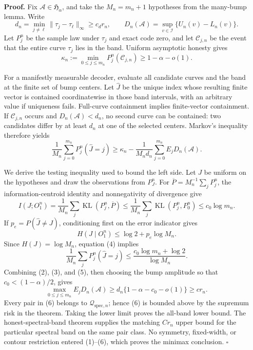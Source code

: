 \textbf{Proof.}
Fix \(\mathcal A\in\mathfrak H_\alpha\), and take the \(M_n=m_n+1\) hypotheses from the many-bump lemma.  Write
\[
 d_n=\min_{j\ne\ell}\|\tau_j-\tau_\ell\|_\infty\ge c_dr_n,
 \qquad
 D_n(\mathcal A)=\sup_{v\in\mathcal I}\{U_n(v)-L_n(v)\}. \tag{1}
\]
Let \(P_j^n\) be the sample law under \(\tau_j\) and exact code zero, and let \(\mathcal C_{j,n}\) be the event that the entire curve \(\tau_j\) lies in the band.  Uniform asymptotic honesty gives
\[
 \kappa_n:=\min_{0\le j\le m_n}P_j^n(\mathcal C_{j,n})
 \ge1-\alpha-o(1). \tag{2}
\]

For a manifestly measurable decoder, evaluate all candidate curves and the band at the finite set of bump centers.  Let \(\widehat J\) be the unique index whose resulting finite vector is contained coordinatewise in those band intervals, with an arbitrary value if uniqueness fails.  Full-curve containment implies finite-vector containment.  If \(\mathcal C_{j,n}\) occurs and \(D_n(\mathcal A)<d_n\), no second curve can be contained: two candidates differ by at least \(d_n\) at one of the selected centers.  Markov's inequality therefore yields
\[
 \frac1{M_n}\sum_{j=0}^{m_n}P_j^n(\widehat J=j)
 \ge \kappa_n-
 \frac1{M_nd_n}\sum_{j=0}^{m_n}E_jD_n(\mathcal A). \tag{3}
\]

We derive the testing inequality used to bound the left side.  Let \(J\) be uniform on the hypotheses and draw the observations from \(P_J^n\).  For \(\overline P=M_n^{-1}\sum_jP_j^n\), the information-centroid identity and nonnegativity of divergence give
\[
 I(J;O_1^n)=\frac1{M_n}\sum_j\operatorname{KL}(P_j^n,\overline P)
 \le\frac1{M_n}\sum_j\operatorname{KL}(P_j^n,P_0^n)
 \le c_0\log m_n. \tag{4}
\]
If \(p_e=P(\widehat J\ne J)\), conditioning first on the error indicator gives
\[
 H(J\mid O_1^n)\le\log2+p_e\log M_n.
\]
Since \(H(J)=\log M_n\), equation (4) implies
\[
 \frac1{M_n}\sum_jP_j^n(\widehat J=j)
 \le\frac{c_0\log m_n+\log2}{\log M_n}. \tag{5}
\]
Combining (2), (3), and (5), then choosing the bump amplitude so that \(c_0<(1-\alpha)/2\), gives
\[
 \max_{0\le j\le m_n}E_jD_n(\mathcal A)
 \ge d_n\{1-\alpha-c_0-o(1)\}
 \ge c r_n. \tag{6}
\]
Every pair in (6) belongs to \(\mathcal Q_{\mathrm{spec},n}\); hence (6) is bounded above by the supremum risk in the theorem.  Taking the lower limit proves the all-band lower bound.  The honest-spectral-band theorem supplies the matching \(Cr_n\) upper bound for the particular spectral band on the same pair class.  No symmetry, fixed-width, or contour restriction entered (1)--(6), which proves the minimax conclusion. \(\square\)